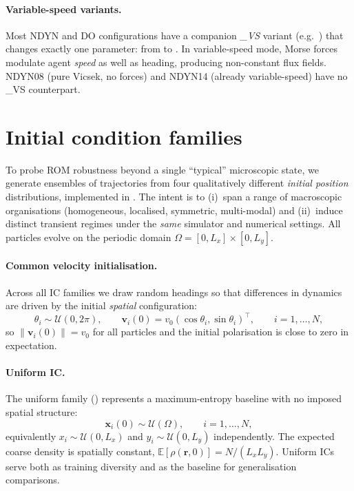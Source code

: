\documentclass{report}
\theoremstyle{plain}
\theoremstyle{remark}
\numberwithin{equation}{section}              %
\begin{document}
\paragraph{Variable-speed variants.}
\label{subsec:vs_variants}
Most NDYN and DO configurations have a companion \emph{\_VS} variant
(e.g.\ ) that changes exactly one parameter:
 from  to .  In
variable-speed mode, Morse forces modulate agent \emph{speed} as well as
heading, producing non-constant flux fields.  NDYN08 (pure Vicsek, no forces)
and NDYN14 (already variable-speed) have no \_VS counterpart.

%
\section{Initial condition families}
\label{sec:ic_families}

To probe ROM robustness beyond a single ``typical'' microscopic state, we
generate ensembles of trajectories from four qualitatively different
\emph{initial position} distributions, implemented in
.  The intent is to
(i)~span a range of macroscopic organisations (homogeneous, localised,
symmetric, multi-modal) and (ii)~induce distinct transient regimes under the
\emph{same} simulator and numerical settings.  All particles evolve on the
periodic domain $\Omega=[0,L_x]\times[0,L_y]$.

\paragraph{Common velocity initialisation.}
Across all IC families we draw random headings so that differences in dynamics
are driven by the initial \emph{spatial} configuration:
\begin{equation}
  \theta_i \sim \mathcal{U}(0,2\pi),\qquad
  \mathbf{v}_i(0)=v_0(\cos\theta_i,\sin\theta_i)^\top,\qquad i=1,\dots,N,
  \label{eq:ic_vel_init}
\end{equation}
so $\|\mathbf{v}_i(0)\|=v_0$ for all particles and the initial polarisation is
close to zero in expectation.

\paragraph{Uniform IC.}
\label{subsec:ic_uniform}
The uniform family () represents a maximum-entropy
baseline with no imposed spatial structure:
\begin{equation}
  \mathbf{x}_i(0)\sim \mathcal{U}(\Omega), \qquad i=1,\dots,N,
  \label{eq:ic_uniform_def}
\end{equation}
equivalently $x_i\sim\mathcal{U}(0,L_x)$ and $y_i\sim\mathcal{U}(0,L_y)$
independently.  The expected coarse density is spatially constant,
$\mathbb{E}[\rho(\mathbf{r},0)] = N/(L_xL_y)$.  Uniform ICs serve both as
training diversity and as the baseline for generalisation comparisons.
\end{document}
